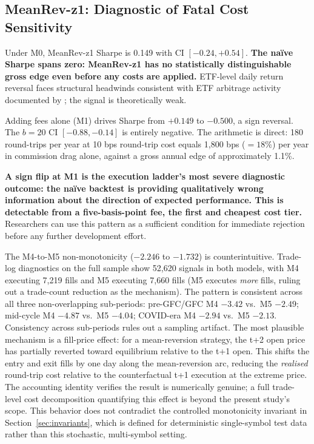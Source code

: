 \documentclass[12pt]{article}
\newcommand{\finding}[1]{\textbf{#1}}
\begin{document}
\subsection{MeanRev-z1: Diagnostic of Fatal Cost Sensitivity}
\label{sec:meanrev_results}

Under M0, MeanRev-z1 Sharpe is 0.149 with CI $[-0.24, +0.54]$.
\finding{The na\"{i}ve Sharpe spans zero: MeanRev-z1 has no
statistically distinguishable gross edge even before any costs
are applied.} ETF-level daily return reversal faces structural headwinds
consistent with ETF arbitrage activity documented by \citet{ben2012exchange};
the signal is theoretically weak.

Adding fees alone (M1) drives Sharpe from $+0.149$ to $-0.500$, a sign
reversal. The $b = 20$ CI $[-0.88, -0.14]$ is entirely negative.
The arithmetic is direct: 180 round-trips per year at 10 bps
round-trip cost equals 1{,}800 bps ($= 18\%$) per year in commission
drag alone, against a gross annual edge of approximately 1.1\%.

\finding{A sign flip at M1 is the execution ladder's most severe
diagnostic outcome: the na\"{i}ve backtest is providing qualitatively
wrong information about the direction of expected performance. This
is detectable from a five-basis-point fee, the first and cheapest cost
tier.} Researchers can use this pattern as a sufficient condition for
immediate rejection before any further development effort.

The M4-to-M5 non-monotonicity ($-2.246$ to $-1.732$) is counterintuitive.
Trade-log diagnostics on the full sample show 52{,}620 signals in both
models, with M4 executing 7{,}219 fills and M5 executing 7{,}660 fills
(M5 executes \emph{more} fills, ruling out a trade-count reduction
as the mechanism). The pattern is consistent across all three
non-overlapping sub-periods: pre-GFC/GFC M4 $-3.42$ vs.\ M5 $-2.49$;
mid-cycle M4 $-4.87$ vs.\ M5 $-4.04$; COVID-era M4 $-2.94$ vs.\ M5
$-2.13$. Consistency across sub-periods rules out a sampling artifact.
The most plausible mechanism is a fill-price effect: for a
mean-reversion strategy, the t+2 open price has partially reverted
toward equilibrium relative to the t+1 open. This shifts the
entry and exit fills by one day along the mean-reversion arc, reducing
the \emph{realised} round-trip cost relative to the counterfactual t+1
execution at the extreme price. The accounting identity verifies the
result is numerically genuine; a full trade-level cost decomposition
quantifying this effect is beyond the present study's scope. This
behavior does not contradict the controlled monotonicity invariant in
Section~\ref{sec:invariants}, which is defined for deterministic
single-symbol test data rather than this stochastic, multi-symbol setting.
\end{document}
